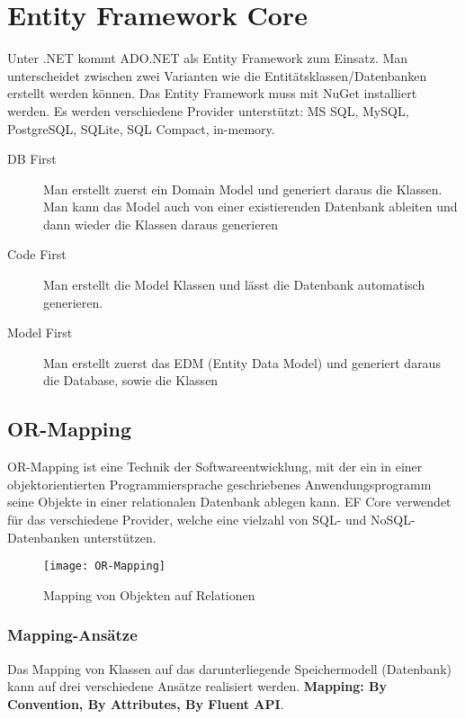 
\section{Entity Framework Core}
Unter .NET kommt ADO.NET als Entity Framework zum Einsatz. Man unterscheidet zwischen zwei Varianten wie die Entitätsklassen/Datenbanken erstellt werden können. Das Entity Framework muss mit NuGet installiert werden.
Es werden verschiedene Provider unterstützt: MS SQL, MySQL, PostgreSQL, SQLite, SQL Compact, in-memory.

\begin{description}
	\item[DB First] Man erstellt zuerst ein Domain Model und generiert daraus die Klassen. Man kann das Model auch von einer existierenden Datenbank ableiten und dann wieder die Klassen daraus generieren
	\item[Code First] Man erstellt die Model Klassen und lässt die Datenbank automatisch generieren.
	\item[Model First] Man erstellt zuerst das EDM (Entity Data Model) und generiert daraus die Database, sowie die Klassen
\end{description}




\subsection{OR-Mapping}
OR-Mapping ist eine Technik der Softwareentwicklung, mit der ein in einer objektorientierten Programmiersprache geschriebenes Anwendungsprogramm seine Objekte in einer relationalen Datenbank ablegen kann. EF Core verwendet für das verschiedene Provider, welche eine vielzahl von  SQL- und NoSQL-Datenbanken unterstützen.

\begin{figure}[h!]
  \center
  \texttt{[image: OR-Mapping]}
  \caption{Mapping von Objekten auf Relationen}
\end{figure}

\subsubsection{Mapping-Ansätze}
Das Mapping von Klassen auf das darunterliegende Speichermodell (Datenbank) kann auf drei verschiedene Ansätze realisiert werden. \textbf{Mapping: By Convention, By Attributes, By Fluent API}. 

